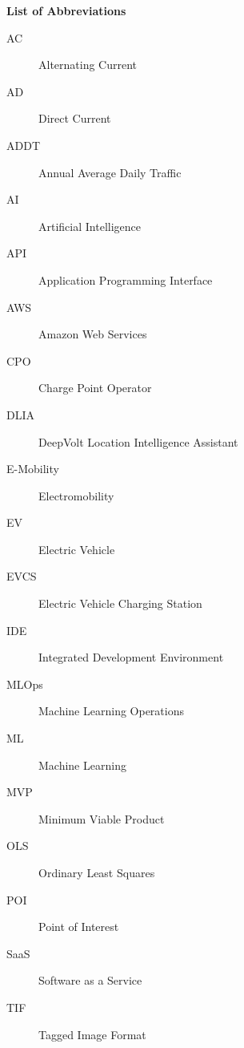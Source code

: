 \documentclass[11pt,oneside,french]{book}
\begin{document}
\newpage




\tableofcontents
\listoffigures

\newpage
\begin{center}
  \textbf{\Large List of Abbreviations}
\end{center}

\begin{description}
  \item[AC] Alternating Current
  \item[AD] Direct Current
  \item[ADDT] Annual Average Daily Traffic
  \item[AI] Artificial Intelligence
  \item[API] Application Programming Interface
  \item[AWS] Amazon Web Services
  \item[CPO] Charge Point Operator
  \item[DLIA] DeepVolt Location Intelligence Assistant
  \item[E-Mobility] Electromobility
  \item[EV] Electric Vehicle
  \item[EVCS] Electric Vehicle Charging Station
  \item[IDE] Integrated Development Environment
  \item[MLOps] Machine Learning Operations
  \item[ML] Machine Learning
  \item[MVP] Minimum Viable Product
  \item[OLS] Ordinary Least Squares
  \item[POI] Point of Interest
  \item[SaaS] Software as a Service
  \item[TIF] Tagged Image Format
\end{description}

\mainmatter










%
\end{document}

